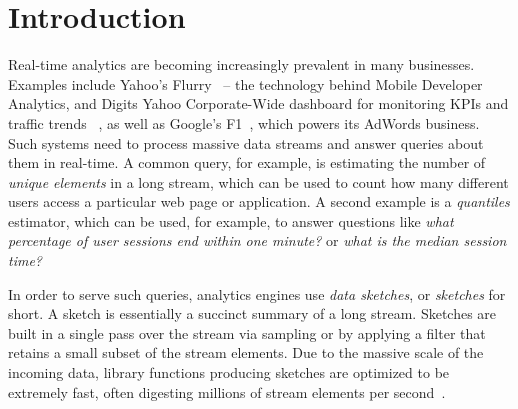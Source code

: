 
\section{Introduction}


Real-time analytics are becoming increasingly prevalent in many businesses. 
Examples include Yahoo's Flurry~\cite{flurry} --
the technology behind Mobile Developer Analytics, and Digits Yahoo Corporate-Wide dashboard for monitoring KPIs and traffic trends%
~\cite{digits},
as well as Google's F1~\cite{Shute2013}, which powers its AdWords
business.
Such systems need to process massive data streams and answer queries about them in real-time.
A common query, for example, is estimating the number of \emph{unique elements} in a long stream, which 
can be used to count how many different users access a particular web page or application. 
A second example is a \emph{quantiles} estimator, which can be used, for example, to  answer questions like  \emph{what percentage of user sessions end within one minute?} or \emph{what is the median session time?}

In order to serve such queries, analytics engines use 
\emph{data sketches}, or \emph{sketches} for short. A sketch is essentially 
a succinct summary of a long stream. 
Sketches are built in a single pass over the stream via sampling or by applying a filter 
that retains a small subset  of the stream elements. 
Due to the massive scale of the incoming data,   library functions producing sketches
are optimized to be extremely fast, often digesting millions of stream elements per second~\cite{sketchesLibrary}. 


